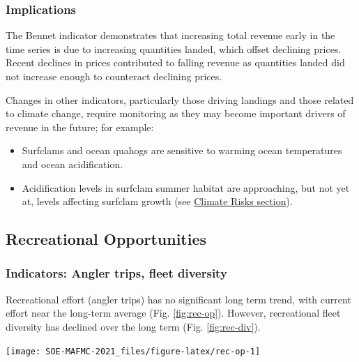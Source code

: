 \documentclass[
  10pt,
]{article}
\providecommand{\tightlist}{%
  \setlength{\itemsep}{0pt}\setlength{\parskip}{0pt}}
\let\origfigure\figure
\let\endorigfigure\endfigure
\renewenvironment{figure}[1][2] {
    \expandafter\origfigure\expandafter[H]
} {
    \endorigfigure
}
\begin{document}
\hypertarget{implications-1}{%
\subsubsection{Implications}\label{implications-1}}

The Bennet indicator demonstrates that increasing total revenue early in
the time series is due to increasing quantities landed, which offset
declining prices. Recent declines in prices contributed to falling
revenue as quantities landed did not increase enough to counteract
declining prices.

Changes in other indicators, particularly those driving landings and
those related to climate change, require monitoring as they may become
important drivers of revenue in the future; for example:

\begin{itemize}
\tightlist
\item
  Surfclams and ocean quahogs are sensitive to warming ocean
  temperatures and ocean acidification.\\
\item
  Acidification levels in surfclam summer habitat are approaching, but
  not yet at, levels affecting surfclam growth (see
  \protect\hyperlink{climate-and-ecosystem-productivity}{Climate Risks
  section}).
\end{itemize}

\hypertarget{recreational-opportunities}{%
\subsection{Recreational
Opportunities}\label{recreational-opportunities}}

\hypertarget{indicators-angler-trips-fleet-diversity}{%
\subsubsection{Indicators: Angler trips, fleet
diversity}\label{indicators-angler-trips-fleet-diversity}}

Recreational effort (angler trips) has no significant long term trend,
with current effort near the long-term average (Fig. \ref{fig:rec-op}).
However, recreational fleet diversity has declined over the long term
(Fig. \ref{fig:rec-div}).

\begin{figure}

{\centering \texttt{[image: SOE-MAFMC-2021\_files/figure-latex/rec-op-1]} 

}

\caption{Recreational effort in the Mid-Atlantic.}\label{fig:rec-op}
\end{figure}
\end{document}
